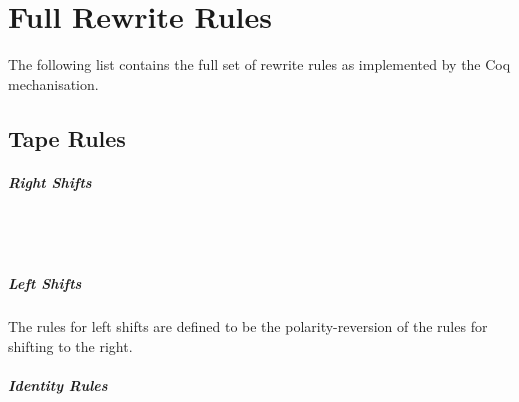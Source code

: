 \chapter{Full Rewrite Rules}\label{app:rewrite_rules}
The following list contains the full set of rewrite rules as implemented by the Coq mechanisation.

\section{Tape Rules}
\paragraph{Right Shifts}
\begin{center}
  \quad \trewwin{\blank}{\blank}{\blank}{\polpos{\blank}}{\polpos{\blank}}{\polpos{\blank}}
\\ 
  \quad {} {\polpos{\blank}}
\quad {}
 \\
  \quad {} {\polpos{\blank}}{\polpos{\blank}}{ } 
\quad {}
\end{center}

\paragraph{Left Shifts}
The rules for left shifts are defined to be the polarity-reversion of the rules for shifting to the right. 

\paragraph{Identity Rules}
\begin{center}
  \\
  \trewwin{\#}{\blank}{\blank}{\#}{\blank}{\blank} 
  \quad \trewwin{\blank}{\blank}{\#}{\blank}{\blank}{\#}
\end{center}



